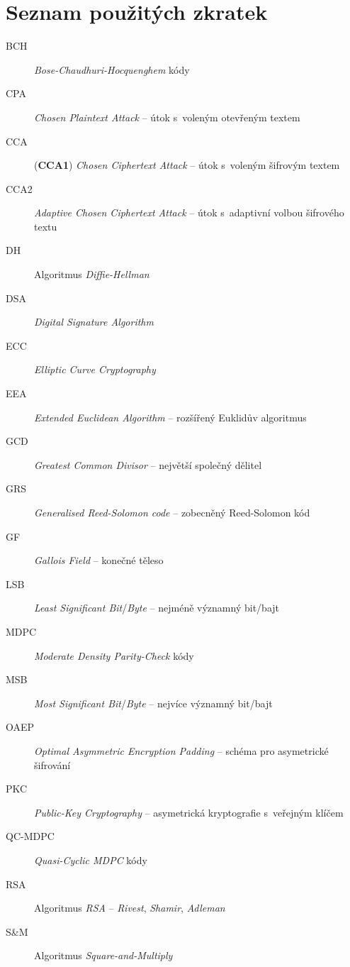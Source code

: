 \documentclass[thesis=M,czech,hidelinks]{FITthesis}[2012/06/26]
\newcommand{\0}{{\textcolor[gray]{0.75}{0}}}
\begin{document}
\chapter{Seznam použitých zkratek}
\begin{description}
    \item[BCH]      \emph{Bose-Chaudhuri-Hocquenghem} kódy
    \item[CPA]      \emph{Chosen Plaintext Attack} -- útok s~voleným otevřeným textem
    \item[CCA]      (\textbf{CCA1}) \emph{Chosen Ciphertext Attack} -- útok s~voleným šifrovým textem
    \item[CCA2]     \emph{Adaptive Chosen Ciphertext Attack} -- útok s~adaptivní volbou šifrového textu
    \item[DH]       Algoritmus \emph{Diffie-Hellman}
    \item[DSA]      \emph{Digital Signature Algorithm}
    \item[ECC]      \emph{Elliptic Curve Cryptography}
    \item[EEA]      \emph{Extended Euclidean Algorithm} -- rozšířený Euklidův algoritmus
    \item[GCD]      \emph{Greatest Common Divisor} -- největší společný dělitel
    \item[GRS]      \emph{Generalised Reed-Solomon code} -- zobecněný Reed-Solomon kód
    \item[GF]       \emph{Gallois Field} -- konečné těleso
    \item[LSB]      \emph{Least Significant Bit}/\emph{Byte} -- nejméně významný bit/bajt
    \item[MDPC]     \emph{Moderate Density Parity-Check} kódy
    \item[MSB]      \emph{Most Significant Bit}/\emph{Byte} -- nejvíce významný bit/bajt
    \item[OAEP]     \emph{Optimal Asymmetric Encryption Padding} -- schéma pro asymetrické šifrování
    \item[PKC]      \emph{Public-Key Cryptography} -- asymetrická kryptografie s~veřejným klíčem
    \item[QC-MDPC]  \emph{Quasi-Cyclic MDPC} kódy
    \item[RSA]      Algoritmus \emph{RSA} -- \emph{Rivest}, \emph{Shamir}, \emph{Adleman}
    \item[S\&M]     Algoritmus \emph{Square-and-Multiply}
\end{description}
\end{document}
